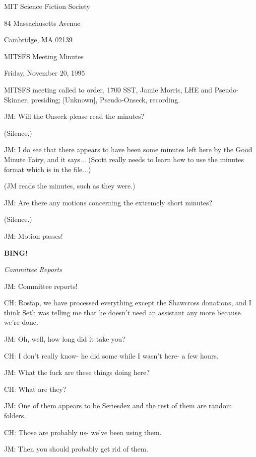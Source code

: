 \documentclass[12pt]{article}
\newcommand{\bing}{{\bf BING!} }
\newcommand{\goto}[1]{\bing \vskip 12pt \centerline{{\em{#1}}}}
\begin{document}
\begin{center}

MIT Science Fiction Society 

84 Massachusetts Avenue

Cambridge, MA 02139

\vspace{12pt}

MITSFS Meeting Minutes 

Friday, November 20, 1995

\end{center}
 
\vspace{18pt}

\setlength{\parskip}{6pt}

\noindent
MITSFS meeting called to order, 1700 SST,
Jamie Morris, LHE and Pseudo-Skinner, presiding; [Unknown], Pseudo-Onseck, recording.

JM: Will the Onseck please read the minutes?

(Silence.)

JM: I do see that there appears to have been some minutes left here by the Good Minute Fairy, and it says... (Scott really needs to learn how to use the minutes format which is in the file...)

(JM reads the minutes, such as they were.)

JM: Are there any motions concerning the extremely short minutes?

(Silence.)

JM: Motion passes!

\goto{Committee Reports}

JM: Committee reports!

CH: Rosfap, we have processed everything except the Shawcross donations, and I think Seth was telling me that he doesn't need an assistant any more because we're done.

JM: Oh, well, how long did it take you?

CH: I don't really know- he did some while I wasn't here- a few hours.

JM: What the fuck are these things doing here?

CH: What are they?

JM: One of them appears to be Seriesdex and the rest of them are random folders.

CH: Those are probably us- we've been using them.

JM: Then you should probably get rid of them.
\end{document}
